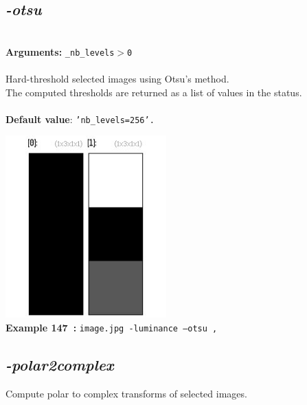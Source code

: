 \documentclass[a4paper,11pt,twoside]{book}
\begin{document}
\subsection{\emph{-otsu} }\vspace*{-0.5em}
~\\\textbf{Arguments: } 
{\small \texttt{\_nb\_levels$>$0}}\\~\\
Hard-threshold selected images using Otsu's method.
~\\The computed thresholds are returned as a list of values in the status.
~\\~\\\textbf{Default value}: {\small \texttt{'nb\_levels=256'.}}
\begin{center}\includegraphics[keepaspectratio=true,height=7cm,width=\textwidth]{img/gmic_def147.jpg}\\
{\footnotesize \textbf{Example 147~:} \texttt{image.jpg -luminance --otsu ,}}
\end{center}

\subsection{\emph{-polar2complex} }\vspace*{-0.5em}
Compute polar to complex transforms of selected images.
\end{document}
